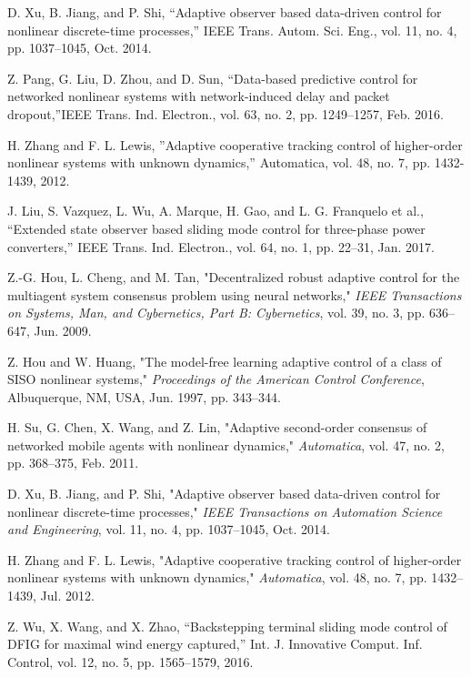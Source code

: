 \documentclass[journal,onecolumn]{IEEEtran}
\begin{document}
\begin{thebibliography}{99}
    D. Xu, B. Jiang, and P. Shi, “Adaptive observer based data-driven control
    for nonlinear discrete-time processes,” IEEE Trans. Autom. Sci. Eng.,
    vol. 11, no. 4, pp. 1037–1045, Oct. 2014.

    Z. Pang, G. Liu, D. Zhou, and D. Sun, “Data-based predictive control for networked nonlinear systems with network-induced delay and packet dropout,”IEEE Trans. Ind. Electron., vol. 63, no. 2, pp. 1249–1257,
    Feb. 2016.

    H. Zhang and F. L. Lewis, ”Adaptive cooperative tracking control of higher-order nonlinear systems with unknown dynamics,” Automatica, vol. 48, no.
    7, pp. 1432-1439, 2012.

    J. Liu, S. Vazquez, L. Wu, A. Marque, H. Gao, and L. G. Franquelo
    et al., “Extended state observer based sliding mode control for three-phase
    power converters,” IEEE Trans. Ind. Electron., vol. 64, no. 1, pp. 22–31,
    Jan. 2017.
    
    Z.-G. Hou, L. Cheng, and M. Tan, "Decentralized robust adaptive control for the multiagent system consensus problem using neural networks," \emph{IEEE Transactions on Systems, Man, and Cybernetics, Part B: Cybernetics}, vol. 39, no. 3, pp. 636–647, Jun. 2009.
    
    Z. Hou and W. Huang, "The model-free learning adaptive control of a class of SISO nonlinear systems," \emph{Proceedings of the American Control Conference}, Albuquerque, NM, USA, Jun. 1997, pp. 343–344.
    
    H. Su, G. Chen, X. Wang, and Z. Lin, "Adaptive second-order consensus of networked mobile agents with nonlinear dynamics," \emph{Automatica}, vol. 47, no. 2, pp. 368–375, Feb. 2011.
    
    D. Xu, B. Jiang, and P. Shi, "Adaptive observer based data-driven control for nonlinear discrete-time processes," \emph{IEEE Transactions on Automation Science and Engineering}, vol. 11, no. 4, pp. 1037–1045, Oct. 2014.
    
    H. Zhang and F. L. Lewis, "Adaptive cooperative tracking control of higher-order nonlinear systems with unknown dynamics," \emph{Automatica}, vol. 48, no. 7, pp. 1432–1439, Jul. 2012.
    
    Z. Wu, X. Wang, and X. Zhao, “Backstepping terminal sliding mode
    control of DFIG for maximal wind energy captured,” Int. J. Innovative
    Comput. Inf. Control, vol. 12, no. 5, pp. 1565–1579, 2016.


\end{thebibliography}
\end{document}
